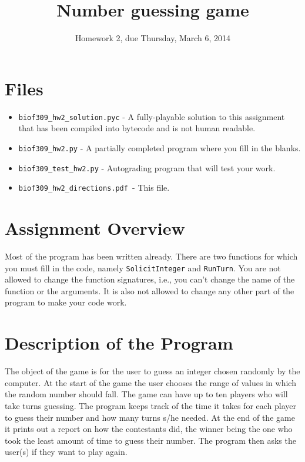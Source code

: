 \documentclass[11pt]{amsart}
\title{Number guessing game}
\author{Homework 2, due Thursday, March 6, 2014}
\begin{document}
\maketitle

\section*{Files}
\begin{itemize}
  \item \texttt{biof309_hw2_solution.pyc} -  A fully-playable solution to this assignment that has been compiled into bytecode and is not human readable.
  \item \texttt{biof309_hw2.py} - A partially completed program where you fill in the blanks.
  \item \texttt{biof309_test_hw2.py} - Autograding program that will test your work.
  \item \texttt{biof309_hw2_directions.pdf }- This file.
\end{itemize}

\section*{Assignment Overview}
Most of the program has been written already. There are two functions for which you must fill in the code, namely \texttt{SolicitInteger} and \texttt{RunTurn}. You are not allowed to change the function signatures, i.e.,  you can't change the name of the function or the arguments. It is also not allowed to change any other part of the program to make your code work.

\section*{Description of the Program}
The object of the game is for the user to guess an integer chosen randomly by the computer. At the start of the game the user chooses the range of values in which the random number should fall. The game can have up to ten
players who will take turns guessing. The program keeps track of the time it takes for each
player to guess their number and how many turns s/he needed.  At the end of the game it prints
out a report on how the contestants did, the winner being the one who took the least amount of
time to guess their number. The program then asks the user(s) if they want to play again.
\end{document}
